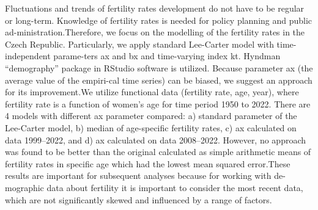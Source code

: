 
\begin{Abstrakt}
    Fluctuations and trends of fertility rates development do not have to be regular or long-term. Knowledge of fertility rates is needed for policy planning and public ad-ministration.Therefore, we focus on the modelling of the fertility rates in the Czech Republic. Particularly, we apply standard Lee-Carter model with time-independent parame-ters ax and bx and time-varying index kt. Hyndman “demography” package in RStudio software is utilized. Because parameter ax (the average value of the empiri-cal time series) can be biased, we suggest an approach for its improvement.We utilize functional data (fertility rate, age, year), where fertility rate is a function of women's age for time period 1950 to 2022. There are 4 models with different ax parameter compared: a) standard parameter of the Lee-Carter model, b) median of age-specific fertility rates, c) ax calculated on data 1999–2022, and d) ax calculated on data 2008–2022. However, no approach was found to be better than the original calculated as simple arithmetic means of fertility rates in specific age which had the lowest mean squared error.These results are important for subsequent analyses because for working with de-mographic data about fertility it is important to consider the most recent data, which are not significantly skewed and influenced by a range of factors.
\end{Abstrakt}



\clearpage
